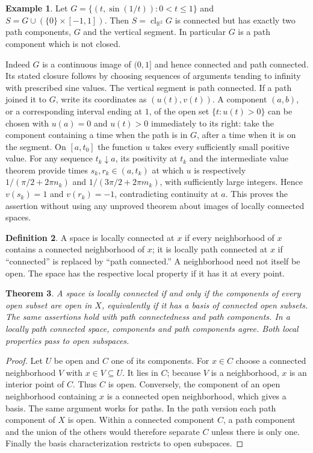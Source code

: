 \documentclass[11pt,oneside,openany]{book}
\newtheorem{theorem}{Theorem}[chapter]
\theoremstyle{definition}
\newtheorem{definition}[theorem]{Definition}
\newtheorem{example}[theorem]{Example}
\theoremstyle{remark}
\newcommand{\R}{\mathbb R}\newcommand{\C}{\mathbb C}
\DeclareMathOperator{\cl}{cl}
\begin{document}
\begin{example}\label{d10:06:sine-curve}
Let $G=\{(t,\sin(1/t)):0<t\leq1\}$ and $S=G\cup(\{0\}\times[-1,1])$. Then $S=\cl_{\R^2}G$ is connected but has exactly two path components, $G$ and the vertical segment. In particular $G$ is a path component which is not closed.

Indeed $G$ is a continuous image of $(0,1]$ and hence connected and path connected. Its stated closure follows by choosing sequences of arguments tending to infinity with prescribed sine values. The vertical segment is path connected. If a path joined it to $G$, write its coordinates as $(u(t),v(t))$. A component $(a,b)$, or a corresponding interval ending at $1$, of the open set $\{t:u(t)>0\}$ can be chosen with $u(a)=0$ and $u(t)>0$ immediately to its right: take the component containing a time when the path is in $G$, after a time when it is on the segment. On $[a,t_0]$ the function $u$ takes every sufficiently small positive value. For any sequence $t_k\downarrow a$, its positivity at $t_k$ and the intermediate value theorem provide times $s_k,r_k\in(a,t_k)$ at which $u$ is respectively $1/(\pi/2+2\pi n_k)$ and $1/(3\pi/2+2\pi m_k)$, with sufficiently large integers. Hence $v(s_k)=1$ and $v(r_k)=-1$, contradicting continuity at $a$. This proves the assertion without using any unproved theorem about images of locally connected spaces.
\end{example}

\begin{definition}\label{d10:06:local-definitions}
A space is locally connected at $x$ if every neighborhood of $x$ contains a connected neighborhood of $x$; it is locally path connected at $x$ if ``connected'' is replaced by ``path connected.'' A neighborhood need not itself be open. The space has the respective local property if it has it at every point.
\end{definition}

\begin{theorem}\label{d10:06:local-characterization}
A space is locally connected if and only if the components of every open subset are open in $X$, equivalently if it has a basis of connected open subsets. The same assertions hold with path connectedness and path components. In a locally path connected space, components and path components agree. Both local properties pass to open subspaces.
\end{theorem}
\begin{proof}
Let $U$ be open and $C$ one of its components. For $x\in C$ choose a connected neighborhood $V$ with $x\in V\subseteq U$. It lies in $C$; because $V$ is a neighborhood, $x$ is an interior point of $C$. Thus $C$ is open. Conversely, the component of an open neighborhood containing $x$ is a connected open neighborhood, which gives a basis. The same argument works for paths. In the path version each path component of $X$ is open. Within a connected component $C$, a path component and the union of the others would therefore separate $C$ unless there is only one. Finally the basis characterization restricts to open subspaces.
\end{proof}
\end{document}
